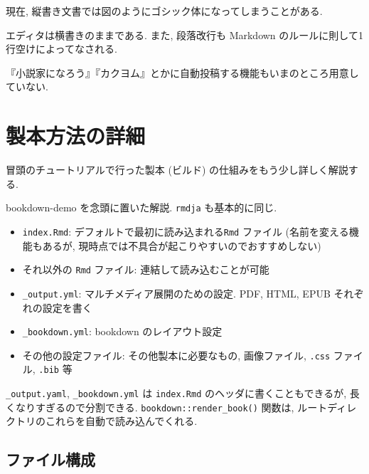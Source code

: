 \documentclass[
]{bxjsbook}
\providecommand{\tightlist}{%
  \setlength{\itemsep}{0pt}\setlength{\parskip}{0pt}}
\newenvironment{infobox}[1]{\begin{itemize}\renewcommand{\labelitemi}{\raisebox{-.7\height}[0pt][0pt]{%
  {\setkeys{Gin}{width=3em,keepaspectratio}\texttt{[image: \_latex/\_img/\#1]}}}}
  \setlength{\fboxsep}{1em}
  \begin{greyblock}
  \item
  }{\end{greyblock}\end{itemize}
}
\newenvironment{tip}{\begin{infobox}{tip}}{\end{infobox}}
\newenvironment{warning}{\begin{infobox}{warning}}{\end{infobox}}
\theoremstyle{definition}
\theoremstyle{definition}
\theoremstyle{definition}
\theoremstyle{remark}
\begin{document}
\begin{warning}
現在, 縦書き文書では図のようにゴシック体になってしまうことがある.
\end{warning}

\begin{tip}
エディタは横書きのままである. また, 段落改行も Markdown
のルールに則して1行空けによってなされる.
\end{tip}

\begin{tip}
『小説家になろう』『カクヨム』とかに自動投稿する機能もいまのところ用意していない.
\end{tip}

\hypertarget{ux88fdux672cux65b9ux6cd5ux306eux8a73ux7d30}{%
\chapter{製本方法の詳細}\label{ux88fdux672cux65b9ux6cd5ux306eux8a73ux7d30}}

冒頭のチュートリアルで行った製本 (ビルド)
の仕組みをもう少し詳しく解説する.

bookdown-demo を念頭に置いた解説. \texttt{rmdja} も基本的に同じ.

\begin{itemize}
\tightlist
\item
  \texttt{index.Rmd}: デフォルトで最初に読み込まれる\texttt{Rmd}
  ファイル (名前を変える機能もあるが,
  現時点では不具合が起こりやすいのでおすすめしない)
\item
  それ以外の \texttt{Rmd} ファイル: 連結して読み込むことが可能
\item
  \texttt{\_output.yml}: マルチメディア展開のための設定. PDF, HTML, EPUB
  それぞれの設定を書く
\item
  \texttt{\_bookdown.yml}: bookdown のレイアウト設定
\item
  その他の設定ファイル: その他製本に必要なもの, 画像ファイル,
  \texttt{.css} ファイル, \texttt{.bib} 等
\end{itemize}

\texttt{\_output.yaml}, \texttt{\_bookdown.yml} は \texttt{index.Rmd}
のヘッダに書くこともできるが, 長くなりすぎるので分割できる.
\texttt{bookdown::render\_book()} 関数は,
ルートディレクトリのこれらを自動で読み込んでくれる.

\hypertarget{ux30d5ux30a1ux30a4ux30ebux69cbux6210}{%
\section{ファイル構成}\label{ux30d5ux30a1ux30a4ux30ebux69cbux6210}}
\end{document}
